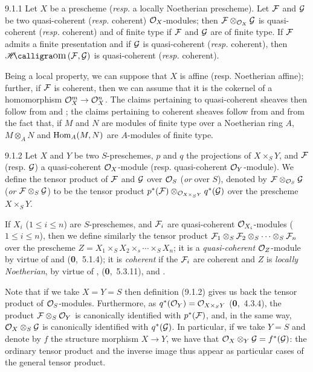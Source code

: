 \documentclass[../main.tex]{subfiles}
\begin{document}
\begin{env}[Proposition]{9.1.1}
    Let $X$ be a prescheme (\emph{resp.} a locally Noetherian prescheme).
    Let $\mathcal{F}$ and $\mathcal{G}$ be two quasi-coherent (\emph{resp.} coherent) $\mathcal{O}_X$-modules; then $\mathcal{F}\otimes_{\mathcal{O}_X}\mathcal{G}$ is quasi-coherent (\emph{resp.} coherent) and of finite type if $\mathcal{F}$ and $\mathcal{G}$ are of finite type.
    If $\mathcal{F}$ admits a finite presentation and if $\mathcal{G}$ is quasi-coherent (\emph{resp.} coherent), then $\sheafHom(\sheaf{F},\sheaf{G})$ is quasi-coherent (\emph{resp.} coherent).
\end{env}

Being a local property, we can suppose that $X$ is affine (resp. Noetherian affine); further, if $\mathcal{F}$ is coherent, then we can assume that it is the cokernel of a homomorphism $\mathcal{O}_X^m\to\mathcal{O}_X^n$.
The claims pertaining to quasi-coherent sheaves then follow from  and ; the claims pertaining to coherent sheaves follow from  and from the fact that, if $M$ and $N$ are modules of finite type over a Noetherian ring $A$, $M\otimes_A N$ and $\operatorname{Hom}_A(M,N)$ are $A$-modules of finite type.

\begin{env}[Definition]{9.1.2}
    Let $X$ and $Y$ be two $S$-preschemes, $p$ and $q$ the projections of $X\times_S Y$, and $\mathcal{F}$ (resp. $\mathcal{G}$) a quasi-coherent $\mathcal{O}_X$-module (resp. quasi-coherent $\mathcal{O}_Y$-module).
    We define the tensor product of $\mathcal{F}$ and $\mathcal{G}$ over $\mathcal{O}_S$ (\emph{or} over $S$), denoted by $\mathcal{F}\otimes_{\mathcal{O}_S}\mathcal{G}$ (\emph{or} $\mathcal{F}\otimes_S\mathcal{G}$) to be the tensor product $p^*(\mathcal{F})\otimes_{\mathcal{O}_{X\times_S Y}}q^\ast(\mathcal{G})$ over the prescheme $X\times_S Y$.
\end{env}


If $X_i$ ($1\leq i\leq n$) are $S$-preschemes, and $\mathcal{F}_i$ are quasi-coherent $\mathcal{O}_{X_i}$-modules ($1\leq i\leq n$), then we define similarly the tensor product $\mathcal{F}_1\otimes_S\mathcal{F}_2\otimes_S\cdots\otimes_S\mathcal{F}_n$ over the prescheme $Z=X_1\times_S X_2\times_s\cdots\times_S X_n$; it is a \emph{quasi-coherent} $\mathcal{O}_Z$-module by virtue of  and (\textbf{0},~5.1.4); it is \emph{coherent} if the $\mathcal{F}_i$ are coherent and $Z$ is \emph{locally Noetherian}, by virtue of , (\textbf{0},~5.3.11), and .

Note that if we take $X=Y=S$ then definition (9.1.2) gives us back the tensor product of $\mathcal{O}_S$-modules.
Furthermore, as $q^\ast(\mathcal{O}_Y)=\mathcal{O}_{X\times_S Y}$ (\textbf{0},~4.3.4), the product $\mathcal{F}\otimes_S\mathcal{O}_Y$ is canonically identified with $p^\ast(\mathcal{F})$, and, in the same way, $\mathcal{O}_X\otimes_S\mathcal{G}$ is canonically identified with $q^*(\mathcal{G})$.
In particular, if we take $Y=S$ and denote by $f$ the structure morphism $X\to Y$, we have that $\mathcal{O}_X\otimes_Y\mathcal{G}=f^\ast(\mathcal{G})$: the ordinary tensor product and the inverse image thus appear as particular cases of the general tensor product.
\end{document}

